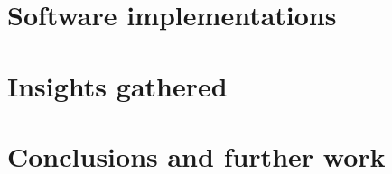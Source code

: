 \documentclass[runningheads]{llncs}
\begin{document}
\section{Software implementations}\label{sec:imp}
\section{Insights gathered}\label{sec:ins}
\section{Conclusions and further work}\label{sec:con}
%
%
%


%
% 
% 
% 
% 
\end{document}
